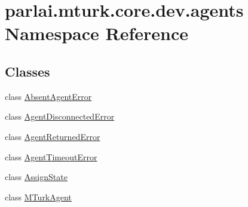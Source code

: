 \hypertarget{namespaceparlai_1_1mturk_1_1core_1_1dev_1_1agents}{}\section{parlai.\+mturk.\+core.\+dev.\+agents Namespace Reference}
\label{namespaceparlai_1_1mturk_1_1core_1_1dev_1_1agents}
\subsection*{Classes}
\begin{DoxyCompactItemize}
\item 
class \hyperlink{classparlai_1_1mturk_1_1core_1_1dev_1_1agents_1_1AbsentAgentError}{Absent\+Agent\+Error}
\item 
class \hyperlink{classparlai_1_1mturk_1_1core_1_1dev_1_1agents_1_1AgentDisconnectedError}{Agent\+Disconnected\+Error}
\item 
class \hyperlink{classparlai_1_1mturk_1_1core_1_1dev_1_1agents_1_1AgentReturnedError}{Agent\+Returned\+Error}
\item 
class \hyperlink{classparlai_1_1mturk_1_1core_1_1dev_1_1agents_1_1AgentTimeoutError}{Agent\+Timeout\+Error}
\item 
class \hyperlink{classparlai_1_1mturk_1_1core_1_1dev_1_1agents_1_1AssignState}{Assign\+State}
\item 
class \hyperlink{classparlai_1_1mturk_1_1core_1_1dev_1_1agents_1_1MTurkAgent}{M\+Turk\+Agent}
\end{DoxyCompactItemize}

